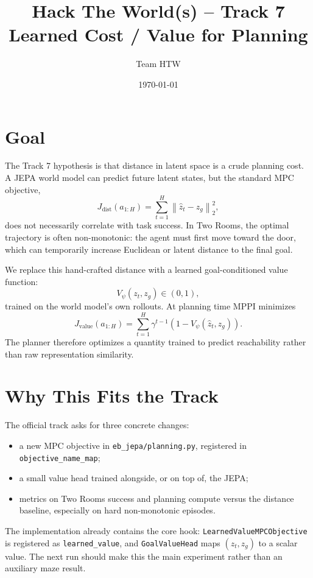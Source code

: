 \documentclass[11pt]{article}
\title{Hack The World(s) -- Track 7\\Learned Cost / Value for Planning}
\author{Team HTW}
\date{\today}
\newcommand{\code}[1]{\texttt{#1}}
\begin{document}
\maketitle

\section{Goal}

The Track 7 hypothesis is that distance in latent space is a crude planning
cost. A JEPA world model can predict future latent states, but the standard MPC
objective,
\[
  J_{\mathrm{dist}}(a_{1:H}) =
  \sum_{t=1}^{H} \left\| \hat z_t - z_g \right\|_2^2,
\]
does not necessarily correlate with task success. In Two Rooms, the optimal
trajectory is often non-monotonic: the agent must first move toward the door,
which can temporarily increase Euclidean or latent distance to the final goal.

We replace this hand-crafted distance with a learned goal-conditioned value
function:
\[
  V_\psi(z_t, z_g) \in (0,1),
\]
trained on the world model's own rollouts. At planning time MPPI minimizes
\[
  J_{\mathrm{value}}(a_{1:H}) =
  \sum_{t=1}^{H} \gamma^{t-1} \left(1 - V_\psi(\hat z_t, z_g)\right).
\]
The planner therefore optimizes a quantity trained to predict reachability
rather than raw representation similarity.

\section{Why This Fits the Track}

The official track asks for three concrete changes:
\begin{itemize}
  \item a new MPC objective in \code{eb\_jepa/planning.py}, registered in
  \code{objective\_name\_map};
  \item a small value head trained alongside, or on top of, the JEPA;
  \item metrics on Two Rooms success and planning compute versus the distance
  baseline, especially on hard non-monotonic episodes.
\end{itemize}

The implementation already contains the core hook:
\code{LearnedValueMPCObjective} is registered as \code{learned\_value}, and
\code{GoalValueHead} maps \((z_t,z_g)\) to a scalar value. The next run should
make this the main experiment rather than an auxiliary maze result.
\end{document}
